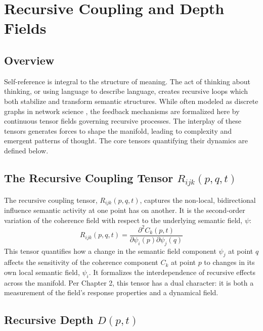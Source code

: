 \chapter{Recursive Coupling and Depth Fields}

\section{Overview}

Self-reference is integral to the structure of meaning. The act of thinking about thinking, or using language to describe language, creates recursive loops which both stabilize and transform semantic structures. While often modeled as discrete graphs in network science \autocite{Barabasi2016}, the feedback mechanisms are formalized here by continuous tensor fields governing recursive processes. The interplay of these tensors generates forces to shape the manifold, leading to complexity and emergent patterns of thought. The core tensors quantifying their dynamics are defined below.

\section{\texorpdfstring{The Recursive Coupling Tensor $R_{ijk}(p, q, t)$}{The Recursive Coupling Tensor R_ijk(p, q, t)}}

The recursive coupling tensor, \(R_{ijk}(p, q, t)\), captures the non-local, bidirectional influence semantic activity at one point has on another. It is the second-order variation of the coherence field with respect to the underlying semantic field, \(\psi\):
\begin{equation}
R_{ijk}(p, q, t) = \frac{\partial^2 C_k(p,t)}{\partial \psi_i(p) \partial \psi_j(q)}
\end{equation}
This tensor quantifies how a change in the semantic field component \(\psi_j\) at point \(q\) affects the sensitivity of the coherence component \(C_k\) at point \(p\) to changes in its own local semantic field, \(\psi_i\). It formalizes the interdependence of recursive effects across the manifold. Per Chapter 2, this tensor has a dual character: it is both a measurement of the field's response properties and a dynamical field.

\section{\texorpdfstring{Recursive Depth $D(p, t)$}{Recursive Depth D(p, t)}}

